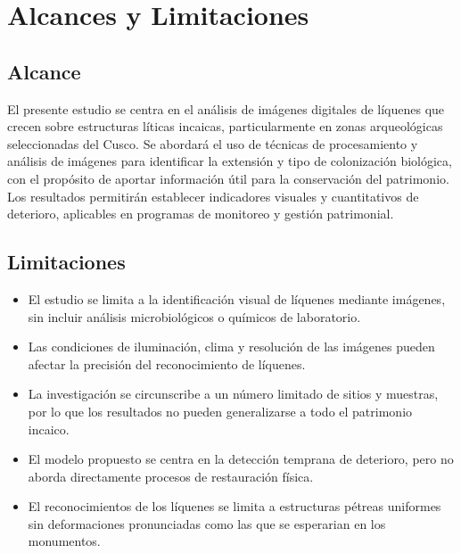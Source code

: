 \chapter{Alcances y Limitaciones}

\section{Alcance}
El presente estudio se centra en el análisis de imágenes digitales de líquenes que crecen sobre estructuras líticas incaicas, particularmente en zonas arqueológicas seleccionadas del Cusco.  
Se abordará el uso de técnicas de procesamiento y análisis de imágenes para identificar la extensión y tipo de colonización biológica, con el propósito de aportar información útil para la conservación del patrimonio.  
Los resultados permitirán establecer indicadores visuales y cuantitativos de deterioro, aplicables en programas de monitoreo y gestión patrimonial.

\section{Limitaciones}

\begin{itemize}
    \item El estudio se limita a la identificación visual de líquenes mediante imágenes, sin incluir análisis microbiológicos o químicos de laboratorio.
    \item Las condiciones de iluminación, clima y resolución de las imágenes pueden afectar la precisión del reconocimiento de líquenes.
    \item La investigación se circunscribe a un número limitado de sitios y muestras, por lo que los resultados no pueden generalizarse a todo el patrimonio incaico.
    \item El modelo propuesto se centra en la detección temprana de deterioro, pero no aborda directamente procesos de restauración física.
    \item El reconocimientos de los líquenes se limita a estructuras pétreas uniformes sin deformaciones pronunciadas como las que se esperarian en los monumentos. 
\end{itemize}